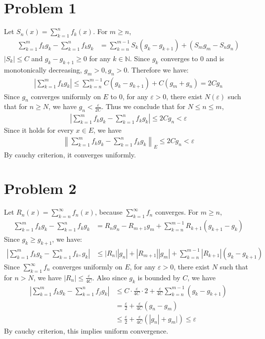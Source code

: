 \documentclass{report}
\def\ve{\varepsilon}
\begin{document}
    \section*{Problem 1}
    Let $S_n(x) = \sum_{k=1}^n f_k(x)$. For $m \ge n$,
    \begin{align*}
        \sum_{k=1}^m f_k g_k - \sum_{k=1}^n f_k g_k &= \sum_{k=n}^{m-1}S_k(g_k-g_{k+1})
            + (S_m g_m - S_n g_n) 
    \end{align*}
    $|S_k| \le C$ and $g_k - g_{k+1} \ge 0$ for any $k \in \mathbb{N}$. 
    Since $g_k$ converges to 0 and is monotonically decreasing, $g_m > 0, g_n > 0$. 
    Therefore we have:
    \begin{align*}
        \left| \sum_{k=1}^m f_k g_k\right| \le \sum_{k=n}^{m-1} C (g_k-g_{k+1}) + 
            C(g_m + g_n) = 2Cg_n
    \end{align*}
    Since $g_n$ converges uniformly on $E$ to 0, for any $\varepsilon > 0$, there 
    exist $N(\varepsilon)$ such that for $n \ge N$, we have $g_n<\frac{\varepsilon}{2C}$.
    Thus we conclude that for $N \le n \le m$, 
    \begin{align*}
        \left| \sum_{k=1}^m f_k g_k - \sum_{k=1}^n f_k g_k\right| \le 2Cg_n < \varepsilon
    \end{align*}
    Since it holds for every $x \in E$, we have 
    \begin{align*}
        \left\| \sum_{k=1}^m f_k g_k-\sum_{k=1}^n f_k g_k \right\|_E \le 2Cg_n < \ve
    \end{align*}
    By cauchy criterion, it converges uniformly.
    
    \section*{Problem 2}
    Let $R_n(x) = \sum_{k=n}^\infty f_n (x)$, because $\sum_{k=1}^\infty f_n$ converges.
    For $m \ge n$,
    \begin{align*}
        \sum_{k=1}^m f_k g_k - \sum_{k=1}^n f_k g_k &= 
            R_n g_n - R_{m+1} g_m + \sum_{k=n}^{m-1}R_{k+1} (g_{k+1} - g_k)
    \end{align*}
    Since $g_{k} \ge g_{k+1}$, we have:
    \begin{align*}
        \left| \sum_{k=1}^m f_k g_k - \sum_{k=1}^n f_k, g_k \right| &\le
            |R_n| |g_n| + |R_{m+1}| |g_m| + \sum_{k=n}^{m-1} |R_{k+1}| (g_k - g_{k+1})
    \end{align*}
    Since $\sum_{k=1}^\infty f_n$ converges uniformly on $E$, for any $\ve > 0$,
    there exist $N$ such that for $n > N$,
    we have $|R_n| \le \frac{\ve}{4C}$. Also since $g_k$ is bounded by $C$,
    we have
    \begin{align*}
        \left| \sum_{k=1}^m f_k g_k - \sum_{k=1}^n f_j g_k \right| &\le 
            C \cdot \frac{\ve}{4C} \cdot 2 + \frac{\ve}{4C} \sum_{k=n}^{m-1} 
            (g_k - g_{k+1}) \\
            &= \frac{\ve}{2} + \frac{\ve}{4C} (g_n - g_m) \\
            &\le \frac{\ve}{2} + \frac{\ve}{4C} (|g_n|+g_m|) \le \ve
    \end{align*}
    By cauchy criterion, this implies uniform convergence.
\end{document}
